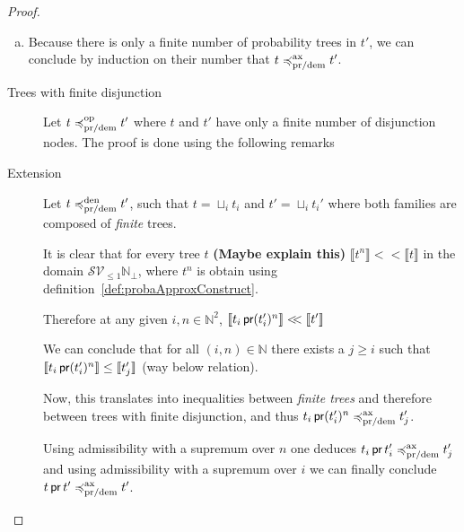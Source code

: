 \begin{proof}
\begin{enumerate}[(a)]
        \item Because there is only a finite number 
            of probability trees in $t'$, we can 
            conclude by induction on their number that 
            $t \preccurlyeq^{\text{ax}}_{\text{pr/dem}} t'$.
    \end{enumerate}

  
\begin{description}
        \item[Trees with finite disjunction]

    Let $t \preccurlyeq^{\text{op}}_{\text{pr/dem}} t'$ 
    where $t$ and $t'$ have only a finite number 
    of disjunction nodes.
    The proof is done using the following 
    remarks


        \item[Extension]
    Let $t \preccurlyeq^{\text{den}}_{\text{pr/dem}} t'$,
    such that $t = \sqcup_i t_i$ and $t' = \sqcup_i t_i'$ 
    where both families are composed of \emph{finite} trees.

    It is clear that for every tree $t$
    \textbf{(Maybe explain this)} $\llbracket t^n \rrbracket <\!\!< \llbracket t \rrbracket$ 
    in the domain $\mathcal{S}\mathcal{V}_{\leq 1} \mathbb{N}_\bot$, 
    where $t^n$ is obtain using definition~\ref{def:probaApproxConstruct}.

    Therefore at any given $i,n \in \mathbb{N}^2$, 
    $\llbracket t_i \operatorname{\textsf{pr}} (t_i')^n \rrbracket <\!\!< \llbracket t' \rrbracket$

    We can conclude that for all $(i,n) \in \mathbb{N}$ there exists a 
    $j \geq i$ such that $\llbracket t_i \operatorname{\textsf{pr}} (t_i')^n \rrbracket \leq
    \llbracket t_j' \rrbracket$ (way below relation).

    Now, this translates into inequalities between \emph{finite trees}
    and therefore between trees with finite disjunction, and thus 
    $ t_i \operatorname{\textsf{pr}} (t_i')^n \preccurlyeq^{\text{ax}}_{\text{pr/dem}} t_j'$.

    Using admissibility with a supremum over $n$ 
    one deduces $t_i \operatorname{\textsf{pr}} t_i' \preccurlyeq^{\text{ax}}_{\text{pr/dem}} t_j'$
    and using admissibility with a supremum over $i$ we can finally conclude
    $t \operatorname{\textsf{pr}} t' \preccurlyeq^{\text{ax}}_{\text{pr/dem}} t'$.
    \end{description}
 \end{proof}


